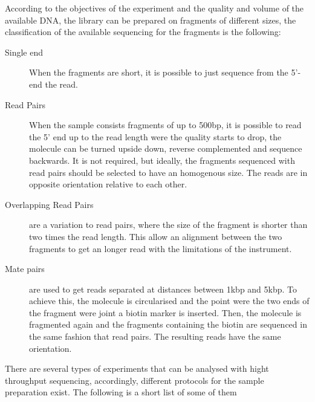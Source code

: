 According to the objectives of the experiment and the quality and volume of the available DNA, the library can be prepared on fragments of different sizes, the classification of the available sequencing for the fragments is the following\cite{Myllykangas2012,Metzker2010,Shendure2008,Hutchison2007}:

\begin{description}
\item[Single end] When the fragments are short, it is possible to just sequence from the 5'-end the read.
\item[Read Pairs] When the sample consists fragments of up to 500bp, it is possible to read the 5' end up to the read length were the quality starts to drop, the molecule can be turned upside down, reverse complemented and sequence backwards. It is not required, but ideally, the fragments sequenced with read pairs should be selected to have an homogenous size. The reads are in opposite orientation relative to each other. 
\item[Overlapping Read Pairs] are a variation to read pairs, where the size of the fragment is shorter than two times the read length. This allow an alignment between the two fragments to get an longer read with the limitations of the instrument.
\item[Mate pairs]  are used to get reads separated at distances between 1kbp and 5kbp. To achieve this, the molecule is circularised and the point were the two ends of the fragment were joint a biotin marker is inserted. Then, the molecule is fragmented again and the fragments containing the biotin are sequenced in the same fashion that read pairs. The resulting reads have the same orientation.
\end{description}


There are several types of experiments that can be analysed with hight throughput sequencing, accordingly, different  protocols for the sample preparation exist. The following is a short list of some of them 

